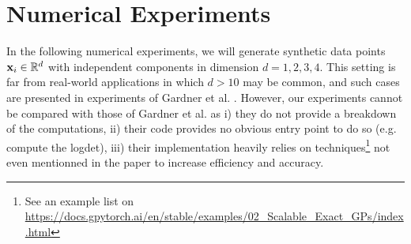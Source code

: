 \documentclass{article}
\begin{document}

\section{Numerical Experiments} \label{sec:numexp}


In the following numerical experiments, we will generate synthetic data points $\boldsymbol{\mathbf{x}}_i \in \mathbb R^d$ with independent components in dimension $d=1,2,3,4$. This setting is far from real-world applications in which $d>10$ may be common, and such cases are presented in experiments of Gardner et al. \cite{gardner_gpytorch_2021}.
However, our experiments cannot be compared with those of Gardner et al. \cite{gardner_gpytorch_2021} as i) they do not provide a breakdown of the computations, ii) their code provides no obvious entry point to do so (e.g. compute the logdet), iii) their implementation heavily relies on techniques\footnote{See an example list on \url{https://docs.gpytorch.ai/en/stable/examples/02_Scalable_Exact_GPs/index.html}} not even mentionned in the paper to increase efficiency and accuracy. 
\end{document}
